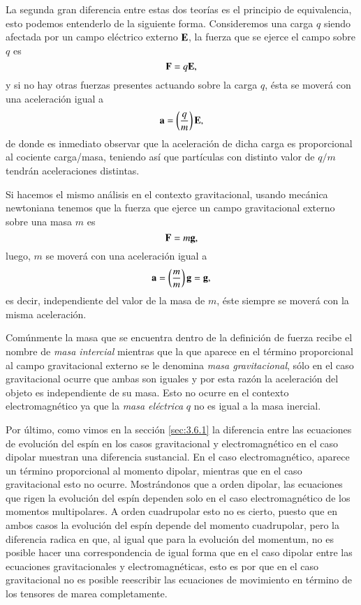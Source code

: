 La segunda gran diferencia entre estas dos teorías es el principio de equivalencia, esto podemos entenderlo de la siguiente forma. Consideremos una carga $q$ siendo afectada por un campo eléctrico externo $\vb{E}$, la fuerza que se ejerce el campo sobre $q$ es
\begin{equation}
\vb{F} = q \vb{E},
\end{equation}
y si no hay otras fuerzas presentes actuando sobre la carga $q$, ésta se moverá con una aceleración igual a
\begin{equation}
\vb{a} = \left( \frac{q}{m} \right) \vb{E},
\end{equation}
de donde es inmediato observar que la aceleración de dicha carga es proporcional al cociente carga/masa, teniendo así que partículas con  distinto valor de $q/m$ tendrán aceleraciones distintas.

Si hacemos el mismo análisis en el contexto gravitacional, usando mecánica newtoniana tenemos que la fuerza que ejerce un campo gravitacional externo sobre una masa $m$ es
\begin{equation}
\label{eq:67}
\vb{F} = m \vb{g},
\end{equation}
luego, $m$ se moverá con una aceleración igual a
\begin{equation}
\vb{a} = \left( \frac{m}{m} \right) \vb{g} = \vb{g},
\end{equation}
es decir, independiente del valor de la masa de $m$, éste siempre se moverá con la misma aceleración. 

Comúnmente la masa que se encuentra dentro de la definición de fuerza recibe el nombre de \textit{masa intercial} mientras que la que aparece en el término proporcional al campo gravitacional externo se le denomina \textit{masa gravitacional}, sólo en el caso gravitacional ocurre que ambas son iguales y por esta razón la aceleración del objeto es independiente de su masa. Esto no ocurre en el contexto electromagnético ya que la \textit{masa eléctrica} $q$ no es igual a la masa inercial.

Por último, como vimos en la sección \ref{sec:3.6.1} la diferencia entre las ecuaciones de evolución del espín en los casos gravitacional y electromagnético en el caso dipolar muestran una diferencia sustancial. En el caso electromagnético, aparece un término proporcional al momento dipolar, mientras que en el caso gravitacional esto no ocurre. Mostrándonos que a orden dipolar, las ecuaciones que rigen la evolución del espín dependen solo en el caso electromagnético de los momentos multipolares. A orden cuadrupolar esto no es cierto, puesto que en ambos casos la evolución del espín depende del momento cuadrupolar, pero la diferencia radica en que, al igual que para la evolución del momentum, no es posible hacer una correspondencia de igual forma que en el caso dipolar entre las ecuaciones gravitacionales y electromagnéticas, esto es por que en el caso gravitacional no es posible reescribir las ecuaciones de movimiento en término de los tensores de marea completamente.